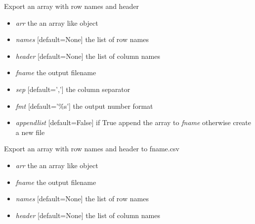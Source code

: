 \documentclass[a4paper,11pt,english]{sphinxmanual}
\begin{document}
\begin{fulllineitems}
\label{modules_doc:cbmpy.CBTools.exportLabelledArrayWithHeader}
Export an array with row names and header
\begin{itemize}
\item {} 
\emph{arr} the an array like object

\item {} 
\emph{names} {[}default=None{]} the list of row names

\item {} 
\emph{header} {[}default=None{]} the list of column names

\item {} 
\emph{fname} the output filename

\item {} 
\emph{sep} {[}default=','{]} the column separator

\item {} 
\emph{fmt} {[}default='\%s'{]} the output number format

\item {} 
\emph{appendlist} {[}default=False{]} if True append the array to \emph{fname} otherwise create a new file

\end{itemize}

\end{fulllineitems}


\begin{fulllineitems}
\label{modules_doc:cbmpy.CBTools.exportLabelledArrayWithHeader2CSV}
Export an array with row names and header to fname.csv
\begin{itemize}
\item {} 
\emph{arr} the an array like object

\item {} 
\emph{fname} the output filename

\item {} 
\emph{names} {[}default=None{]} the list of row names

\item {} 
\emph{header} {[}default=None{]} the list of column names

\end{itemize}

\end{fulllineitems}
\end{document}
